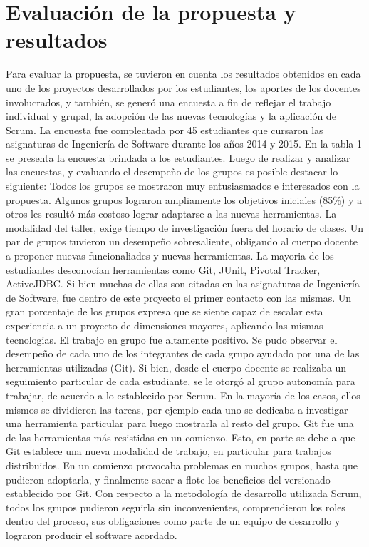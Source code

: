\section{Evaluación de la propuesta y resultados}\label{resultado}
Para evaluar la propuesta, se tuvieron en cuenta los resultados obtenidos en cada uno de los proyectos desarrollados por los  
estudiantes, los aportes de los docentes involucrados, y también, se generó una encuesta a fin de reflejar el trabajo individual y grupal, 
la adopción de las nuevas tecnologías y
la aplicación de Scrum. La encuesta fue compleatada por 45 estudiantes que cursaron las asignaturas de Ingeniería de Software durante
los años 2014 y 2015. En la tabla 1 se presenta la encuesta brindada a los estudiantes.
Luego de realizar y analizar las encuestas, y evaluando el desempeño de los grupos es posible destacar lo siguiente: Todos los
grupos se mostraron muy entusiasmados e interesados con la propuesta. Algunos grupos lograron ampliamente
los objetivos iniciales (85\%) y a otros les resultó más costoso lograr adaptarse a las nuevas herramientas.
La modalidad del taller, exige tiempo de investigación fuera del horario de clases. Un par de grupos tuvieron un desempeño sobresaliente, 
obligando al cuerpo docente a proponer nuevas funcionaliades y nuevas herramientas.
La mayoria de los estudiantes desconocí­an herramientas como Git, JUnit, Pivotal Tracker, ActiveJDBC. Si bien muchas de ellas son citadas en las
asignaturas de Ingenierí­a de Software,
fue dentro de este proyecto el primer contacto con las mismas. Un gran porcentaje de los grupos expresa que se siente capaz de escalar esta experiencia a un proyecto de dimensiones mayores, aplicando las mismas tecnologias.
El trabajo en grupo fue altamente positivo. Se pudo observar el desempeño de cada uno de los integrantes de cada grupo ayudado por una de las 
herramientas utilizadas (Git). Si bien, desde el cuerpo docente se realizaba un seguimiento particular de cada 
estudiante, se le otorgó  al grupo autonomí­a para trabajar, de acuerdo a lo establecido por Scrum.
En la mayoría de los casos, ellos mismos se dividieron las tareas, por ejemplo cada uno se dedicaba a investigar una herramienta particular 
para 
luego mostrarla al resto del grupo. Git fue una de las herramientas
más resistidas en un comienzo. Esto, en parte se debe a que Git  establece una nueva modalidad de trabajo, en particular para trabajos 
distribuidos. En un comienzo provocaba problemas en muchos grupos, hasta que pudieron adoptarla, y finalmente sacar a flote los beneficios  
del versionado establecido por Git. 
Con respecto a la metodología de desarrollo utilizada Scrum, todos los grupos pudieron seguirla sin inconvenientes, comprendieron los roles dentro 
del proceso, sus obligaciones como parte de un equipo de desarrollo y lograron producir el software acordado.